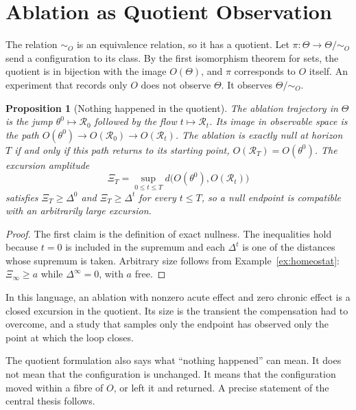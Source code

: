 \documentclass[11pt]{article}
\newtheorem{proposition}[theorem]{Proposition}
\theoremstyle{definition}
\theoremstyle{remark}
\newcommand{\Rop}{\mathcal{R}}
\begin{document}
\section{Ablation as Quotient Observation}\label{sec:quotient}

The relation $\sim_O$ is an equivalence relation, so it has a quotient. Let $\pi:\Theta\to\Theta/{\sim_O}$ send a configuration to its class. By the first isomorphism theorem for sets, the quotient is in bijection with the image $O(\Theta)$, and $\pi$ corresponds to $O$ itself. An experiment that records only $O$ does not observe $\Theta$. It observes $\Theta/{\sim_O}$.

\begin{proposition}[Nothing happened in the quotient]\label{prop:quotient}
The ablation trajectory in $\Theta$ is the jump $\theta^0\mapsto\Rop_0$ followed by the flow $t\mapsto\Rop_t$. Its image in observable space is the path $O(\theta^0)\to O(\Rop_0)\to O(\Rop_t)$. The ablation is exactly null at horizon $T$ if and only if this path returns to its starting point, $O(\Rop_T)=O(\theta^0)$. The excursion amplitude
\[
\Xi_T=\sup_{0\le t\le T}d\bigl(O(\theta^0),O(\Rop_t)\bigr)
\]
satisfies $\Xi_T\ge\Delta^0$ and $\Xi_T\ge\Delta^t$ for every $t\le T$, so a null endpoint is compatible with an arbitrarily large excursion.
\end{proposition}
\begin{proof}
The first claim is the definition of exact nullness. The inequalities hold because $t=0$ is included in the supremum and each $\Delta^t$ is one of the distances whose supremum is taken. Arbitrary size follows from Example~\ref{ex:homeostat}: $\Xi_\infty\ge a$ while $\Delta^\infty=0$, with $a$ free.
\end{proof}

In this language, an ablation with nonzero acute effect and zero chronic effect is a closed excursion in the quotient. Its size is the transient the compensation had to overcome, and a study that samples only the endpoint has observed only the point at which the loop closes.

The quotient formulation also says what ``nothing happened'' can mean. It does not mean that the configuration is unchanged. It means that the configuration moved within a fibre of $O$, or left it and returned. A precise statement of the central thesis follows.
\end{document}
